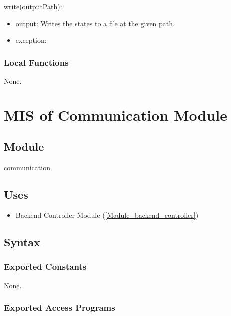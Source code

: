 \documentclass[12pt, titlepage]{article}
\begin{document}
\noindent write(outputPath):
\begin{itemize}
\item output: Writes the states to a file at the given path.
\item exception:  
\end{itemize}

\subsubsection{Local Functions}

None.

\newpage

\section{MIS of Communication Module} \label{Module_communication}

\subsection{Module}

communication

\subsection{Uses}

\begin{itemize}
  \item Backend Controller Module (\ref{Module_backend_controller})
\end{itemize}

\subsection{Syntax}

\subsubsection{Exported Constants}
None.

\subsubsection{Exported Access Programs}
\end{document}

